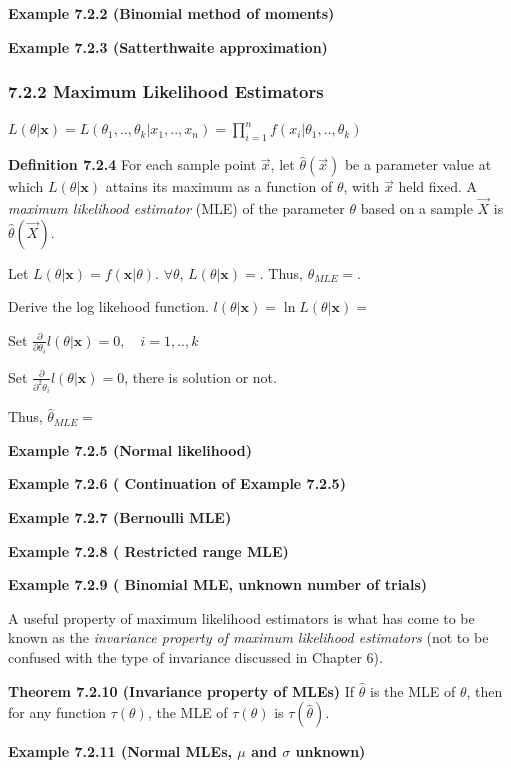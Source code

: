 \documentclass[6pt,twocolumn,Portrait]{article}
\begin{document}
\textbf{Example 7.2.2 (Binomial method of moments)}

\textbf{Example 7.2.3 (Satterthwaite approximation)}

\hypertarget{MLE}{%
\subsubsection{7.2.2 Maximum Likelihood Estimators}\label{MLE}}

\(L(\theta|\mathbf{x})=L(\theta_1,..,\theta_k|x_1,..,x_n)=\prod_{i=1}^n f(x_i|\theta_1,..,\theta_k)\)

\textbf{Definition 7.2.4} For each sample point \(\vec x\), let
\(\hat\theta(\vec x)\) be a parameter value at which
\(L(\theta|\mathbf{x})\) attains its maximum as a function of
\(\theta\), with \(\vec x\) held fixed. A \emph{maximum likelihood
estimator} (MLE) of the parameter \(\theta\) based on a sample
\(\vec X\) is \(\hat\theta(\vec X)\).

Let \(L(\theta|\mathbf{x})=f(\mathbf{x}|\theta)\). \(\forall\theta\),
\(L(\theta|\mathbf{x})=\). Thus, \(\theta_{MLE}=\).

Derive the log likehood function.
\(l(\theta|\mathbf{x})=\ln L(\theta|\mathbf{x})=\)

Set
\(\frac{\partial}{\partial\theta_i}l(\theta|\mathbf{x})=0,\quad i=1,..,k\)

Set \(\frac{\partial}{\partial^2\theta_i}l(\theta|\mathbf{x})=0\), there
is solution or not.

Thus, \(\hat\theta_{MLE}=\)

\textbf{Example 7.2.5 (Normal likelihood)}

\textbf{Example 7.2.6 ( Continuation of Example 7.2.5)}

\textbf{Example 7.2.7 (Bernoulli MLE)}

\textbf{Example 7.2.8 ( Restricted range MLE)}

\textbf{Example 7.2.9 ( Binomial MLE, unknown number of trials)}

A useful property of maximum likelihood estimators is what has come to
be known as the \emph{invariance property of maximum likelihood
estimators} (not to be confused with the type of invariance discussed in
Chapter 6).

\textbf{Theorem 7.2.10 (Invariance property of MLEs)} If \(\hat\theta\)
is the MLE of \(\theta\), then for any function \(\tau(\theta)\), the
MLE of \(\tau(\theta)\) is \(\tau(\hat\theta)\).

\textbf{Example 7.2.11 (Normal MLEs, \(\mu\) and \(\sigma\) unknown)}
\end{document}
